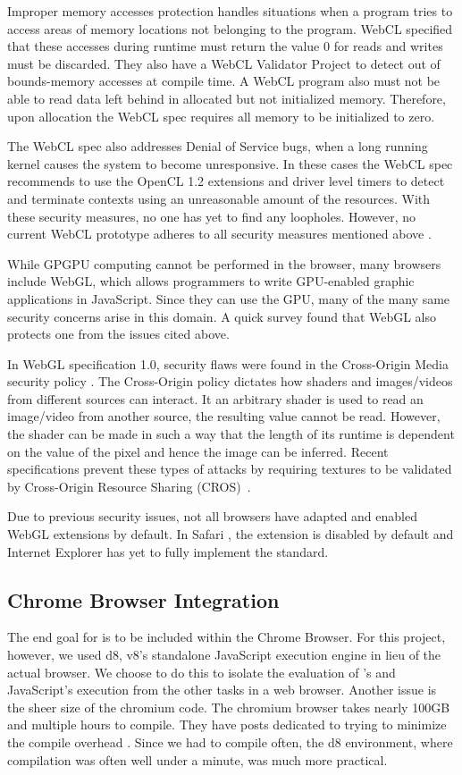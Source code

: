 Improper memory accesses protection handles situations when a program tries to
access areas of memory locations not belonging to the program. WebCL
specified that these accesses during runtime must return the value 0 for reads
and writes must be discarded. They also have a WebCL Validator Project
\cite{webclValidator} to detect out of bounds-memory accesses at compile time. A
WebCL program also must not be able to read data left behind in allocated but
not initialized memory. Therefore, upon allocation the WebCL spec requires all
memory to be initialized to zero.

The WebCL spec also addresses Denial of Service bugs, when a long running kernel
causes the system to become unresponsive. In these cases the WebCL spec
recommends to use the OpenCL 1.2 extensions and driver level timers to detect
and terminate contexts using an unreasonable amount of the resources.
With these security measures, no one has yet to find any loopholes. However, no
current WebCL prototype adheres to all security measures mentioned above
\cite{nokiasecurity}.

While GPGPU computing cannot be performed in the browser, many browsers include
WebGL, which allows programmers to write GPU-enabled graphic applications in
JavaScript. Since they can use the GPU, many of the many same security concerns
arise in this domain. A quick survey found that WebGL also protects one from the
issues cited above.

In WebGL specification 1.0, security flaws were found in the Cross-Origin
Media security policy \cite{webGLerror1, webGLerror2}. The Cross-Origin policy
dictates how shaders and images/videos from different sources can interact. It
an arbitrary shader is used to read an image/video from another source, the
resulting value cannot be read. However, the shader can be made in such a way
that the length of its runtime is dependent on the value of the pixel and hence
the image can be inferred. Recent specifications prevent these types of attacks
by requiring textures to be validated by Cross-Origin Resource Sharing
(CROS)~\cite{cros}.

Due to previous security issues, not all browsers have adapted and enabled WebGL
extensions by default. In Safari \cite{safari}, the extension is disabled by
default and Internet Explorer \cite{IE} has yet to fully implement the standard.

\subsection{Chrome Browser Integration} 
\label{chromeIntegration}
The end goal for \name is to be included within the
Chrome Browser. For this project, however, we used d8, v8's standalone
JavaScript execution engine in lieu of the actual browser. We choose to do this
to isolate the evaluation of \namens's and JavaScript's execution from the other
tasks in a web browser.  Another issue is the sheer size of the chromium code.
The chromium browser takes nearly 100GB and multiple hours to compile. They have
posts dedicated to trying to minimize the compile overhead
\cite{linuxfasterbuilds}.  Since we had to compile often, the d8 environment,
where compilation was often well under a minute, was much more practical.

